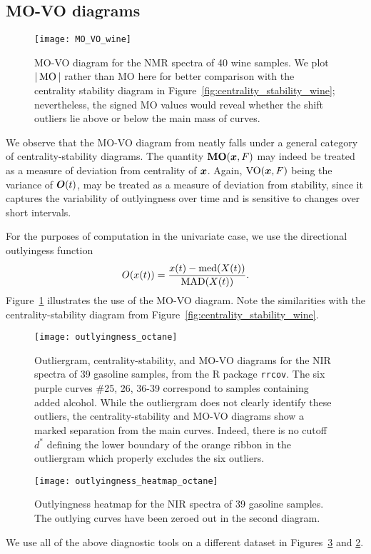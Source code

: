 \subsection{MO-VO diagrams}

\begin{figure}
    \centering
    \texttt{[image: MO\_VO\_wine]}
    \caption{
        MO-VO diagram for the NMR spectra of 40 wine samples.
        We plot $|\operatorname{MO}|$ rather than MO here for better comparison with the
        centrality stability diagram in
        Figure~\ref{fig:centrality_stability_wine}; nevertheless, the signed
        MO values would reveal whether the shift outliers lie above or below
        the main mass of curves.
    }
    \label{fig:MO_VO_wine}
\end{figure}

We observe that the MO-VO diagram from \textcite{dai-genton-2018} neatly falls
under a general category of centrality-stability diagrams.
The quantity $\operatorname{\textbf{MO}}(\bm{x}, F)$ may indeed be treated as a measure of deviation
from centrality of $\bm{x}$.
Again, $\operatorname{VO}(\bm{x}, F)$ being the variance of $\bm{O}(t)$, may be treated as a
measure of deviation from stability, since it captures the variability of
outlyingness over time and is sensitive to changes over short intervals.

For the purposes of computation in the univariate case, we use the directional
outlyingess function
\begin{equation}
    O(x(t)) = \frac{x(t) - \operatorname{med}(X(t))}{\operatorname{MAD}(X(t))}.
\end{equation}
Figure~\ref{fig:MO_VO_wine} illustrates the use of the MO-VO diagram.
Note the similarities with the centrality-stability diagram from
Figure~\ref{fig:centrality_stability_wine}.




\begin{figure}
    \centering
    \texttt{[image: outlyingness\_octane]}
    \caption{
        Outliergram, centrality-stability, and MO-VO diagrams for the NIR
        spectra of 39 gasoline samples, from the R package \texttt{rrcov}.
        The six purple curves \#25, 26, 36-39 correspond to samples containing
        added alcohol.
        While the outliergram does not clearly identify these outliers, the
        centrality-stability and MO-VO diagrams show a marked separation from
        the main curves.
        Indeed, there is no cutoff $d^*$ defining the lower boundary of the
        orange ribbon in the outliergram which properly excludes the six
        outliers.
    }
    \label{fig:outlyingness_octane}
\end{figure}

\begin{figure}
    \centering
    \texttt{[image: outlyingness\_heatmap\_octane]}
    \caption{
        Outlyingness heatmap for the NIR spectra of 39 gasoline samples.
        The outlying curves have been zeroed out in the second diagram.
    }
    \label{fig:outlyingness_heatmap_octane}
\end{figure}


We use all of the above diagnostic tools on a different dataset in
Figures~\ref{fig:outlyingness_heatmap_octane} and \ref{fig:outlyingness_octane}.
